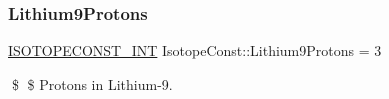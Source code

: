 \subsubsection{\texorpdfstring{Lithium9\+Protons}{Lithium9Protons}}
{\footnotesize\ttfamily \mbox{\hyperlink{group___isotope_const-_macros_ga5f18360b3e99483a35c32d789e62621c}{I\+S\+O\+T\+O\+P\+E\+C\+O\+N\+S\+T\+\_\+\+I\+NT}} Isotope\+Const\+::\+Lithium9\+Protons = 3}

\$ \$ Protons in Lithium-\/9. 
